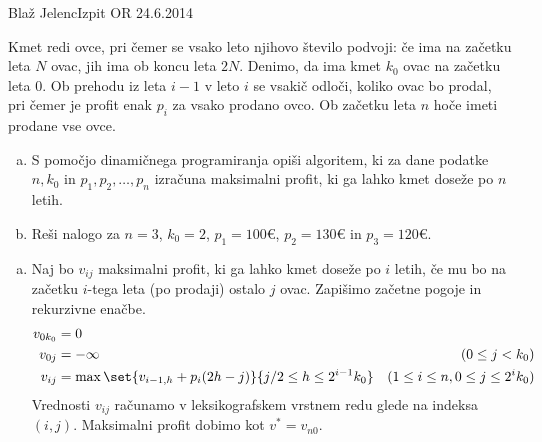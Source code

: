 \begin{naloga}{Blaž Jelenc}{Izpit OR 24.6.2014}
\begin{vprasanje}
Kmet redi ovce, pri čemer se vsako leto njihovo število podvoji:
če ima na začetku leta $N$ ovac, jih ima ob koncu leta $2N$.
Denimo, da ima kmet $k_0$ ovac na začetku leta $0$.
Ob prehodu iz leta $i-1$ v leto $i$ se vsakič odloči,
koliko ovac bo prodal, pri čemer je profit enak $p_i$ za vsako prodano ovco.
Ob začetku leta $n$ hoče imeti prodane vse ovce.

\begin{enumerate}[(a)]
\item S pomočjo dinamičnega programiranja opiši algoritem,
ki za dane podatke $n, k_0$ in $p_1, p_2, \dots, p_n$
izračuna maksimalni profit, ki ga lahko kmet doseže po $n$ letih.

\item Reši nalogo za $n = 3$, $k_0 = 2$,
$p_1 = 100 €$, $p_2 = 130 €$ in $p_3 = 120 €$.
\end{enumerate}
\end{vprasanje}

\begin{odgovor}
\begin{enumerate}[(a)]
\item Naj bo $v_{ij}$ maksimalni profit,
ki ga lahko kmet doseže po $i$ letih,
če mu bo na začetku $i$-tega leta (po prodaji) ostalo $j$ ovac.
Zapišimo začetne pogoje in rekurzivne enačbe.
\begin{align*}
v_{0k_0} &= 0 \\
v_{0j} &= -\infty & (0 \le j < k_0) \\
v_{ij} &= \max\set{v_{i-1,h} + p_i (2h-j)}{j/2 \le h \le 2^{i-1} k_0} & (1 \le i \le n, 0 \le j \le 2^i k_0)
\end{align*}
Vrednosti $v_{ij}$ računamo v leksikografskem vrstnem redu
glede na indeksa $(i, j)$.
Maksimalni profit dobimo kot $v^* = v_{n0}$.


\end{enumerate}
\end{odgovor}
\end{naloga}

